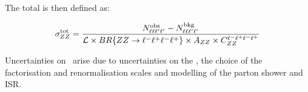 The total \cx is then defined as:

\begin{equation}\label{eq:xsectot_fourl}
\sigma_{ZZ}^{\rm tot} = \frac{ N^{\rm obs}_{\ell\ell\ell'\ell'} - N^{\rm bkg}_{\ell\ell\ell'\ell'}}{\mathcal{L} \times
BR\{ZZ\rightarrow\ell^{-}\ell^{+}\ell^{-}\ell^{+}\} \times A_{ZZ} \times C_{ZZ}^{\ell^{-}\ell^{+}\ell^{-}\ell^{+}}}
\end{equation}

Uncertainties on \AZZ\ arise due to uncertainties on the \partDF, the choice of
the factorisation and renormalisation scales and modelling of the parton shower
and ISR.




